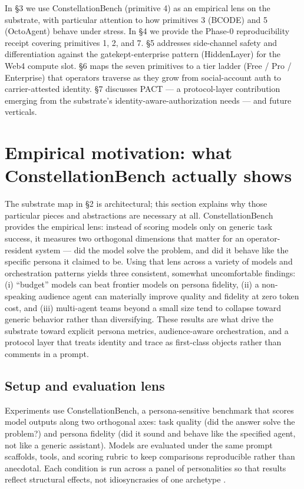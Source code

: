 In §3 we use ConstellationBench (primitive 4) as an empirical lens on
the substrate, with particular attention to how primitives 3 (BCODE) and
5 (OctoAgent) behave under stress. In §4 we provide the Phase-0
reproducibility receipt covering primitives 1, 2, and 7. §5 addresses
side-channel safety and differentiation against the gatekept-enterprise
pattern (HiddenLayer) for the Web4 compute slot. §6 maps the seven
primitives to a tier ladder (Free / Pro / Enterprise) that operators
traverse as they grow from social-account auth to carrier-attested
identity. §7 discusses PACT --- a protocol-layer contribution emerging
from the substrate's identity-aware-authorization needs --- and future
verticals.

\section{Empirical motivation: what ConstellationBench actually
shows}\label{empirical-motivation-what-constellationbench-actually-shows}

The substrate map in §2 is architectural; this section explains why
those particular pieces and abstractions are necessary at all.
ConstellationBench provides the empirical lens: instead of scoring
models only on generic task success, it measures two orthogonal
dimensions that matter for an operator-resident system --- did the model
solve the problem, and did it behave like the specific persona it
claimed to be. Using that lens across a variety of models and
orchestration patterns yields three consistent, somewhat uncomfortable
findings: (i) ``budget'' models can beat frontier models on persona
fidelity, (ii) a non-speaking audience agent can materially improve
quality and fidelity at zero token cost, and (iii) multi-agent teams
beyond a small size tend to collapse toward generic behavior rather than
diversifying. These results are what drive the substrate toward explicit
persona metrics, audience-aware orchestration, and a protocol layer that
treats identity and trace as first-class objects rather than comments in
a prompt.

\subsection{Setup and evaluation
lens}\label{setup-and-evaluation-lens}

Experiments use ConstellationBench, a persona-sensitive benchmark that
scores model outputs along two orthogonal axes: task quality (did the
answer solve the problem?) and persona fidelity (did it sound and behave
like the specified agent, not like a generic assistant). Models are
evaluated under the same prompt scaffolds, tools, and scoring rubric to
keep comparisons reproducible rather than anecdotal. Each condition is
run across a panel of personalities so that results reflect structural
effects, not idiosyncrasies of one archetype
\citep{constellationbench2026}.

